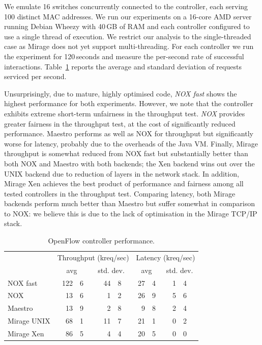 We emulate 16 switches concurrently connected to the controller, each serving
100 distinct MAC addresses. We run our experiments on a 16-core AMD server
running Debian Wheezy with 40\,GB of RAM and each controller configured to use a
single thread of execution. We restrict our analysis to the single-threaded case
as Mirage does not yet support multi-threading. For each controller we run the
experiment for 120\,seconds and measure the per-second rate of successful
interactions. Table~\ref{tbl:controller} reports the average and standard
deviation of requests serviced per second.

Unsurprisingly, due to mature, highly optimised code, \emph{NOX fast} shows the
highest performance for both experiments. However, we note that the controller
exhibits extreme short-term unfairness in the throughput test.  \emph{NOX}
provides greater fairness in the throughput test, at the cost of significantly
reduced performance. Maestro performs as well as NOX for throughput but
significantly worse for latency, probably due to the overheads of the Java VM.
Finally, Mirage throughput is somewhat reduced from NOX fast but substantially
better than both NOX and Maestro with both backends; the Xen backend wins out
over the UNIX backend due to reduction of layers in the network stack. In
addition, Mirage Xen achieves the best product of performance and fairness among
all tested controllers in the throughput test.  Comparing latency, both Mirage
backends perform much better than Maestro but suffer somewhat in comparison to
NOX: we believe this is due to the lack of optimisation in the Mirage TCP/IP
stack.

\begin{table}\small
\newcommand\T{\rule{0pt}{2.6ex}}
\newcommand\B{\rule[-1.2ex]{0pt}{0pt}}
\centering
\begin{tabular} { l | r@{.}l r@{.}l | r@{.}l r@{.}l }
\hline
\T \multirow{2}{*}{Controller} 
   & \multicolumn{4}{c|}{Throughput (kreq/sec)}  
   & \multicolumn{4}{c}{Latency (kreq/sec)} \\
\B & \multicolumn{2}{c}{avg} & \multicolumn{2}{c|}{std. dev.} 
   & \multicolumn{2}{c}{avg} & \multicolumn{2}{c}{std. dev.} \\
\hline
\T NOX fast   & 122&6 & \quad{} 44&8 & 27&4 & \quad{} 1&4 \\
NOX           &  13&6 &  1&2 & 26&9 & 5&6 \\
Maestro       &  13&9 &  2&8 &  9&8 & 2&4 \\
Mirage UNIX   &  68&1 & 11&7 & 21&1 & 0&2 \\
\B Mirage Xen &  86&5 &  4&4 & 20&5 & 0&0 \\
\hline
\end{tabular}
\caption{\label{tbl:controller}OpenFlow controller performance.}
\end{table}

